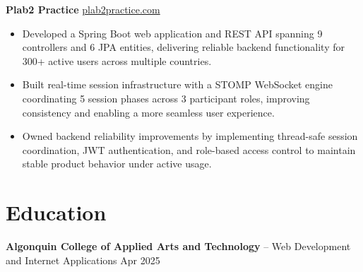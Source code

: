 \documentclass[11pt]{article}       %
\begin{document}
\textbf{Plab2 Practice} \hfill \href{https://plab2practice.com}{plab2practice.com} \\
\vspace{-9pt}
\begin{itemize}
  \item Developed a Spring Boot web application and REST API spanning 9 controllers and 6 JPA entities, delivering reliable backend functionality for 300+ active users across multiple countries.
  \item Built real-time session infrastructure with a STOMP WebSocket engine coordinating 5 session phases across 3 participant roles, improving consistency and enabling a more seamless user experience.
  \item Owned backend reliability improvements by implementing thread-safe session coordination, JWT authentication, and role-based access control to maintain stable product behavior under active usage.
\end{itemize}





\section*{Education}
\textbf{Algonquin College of Applied Arts and Technology} -- Web Development and Internet Applications
\hfill Apr 2025 \\
\end{document}
